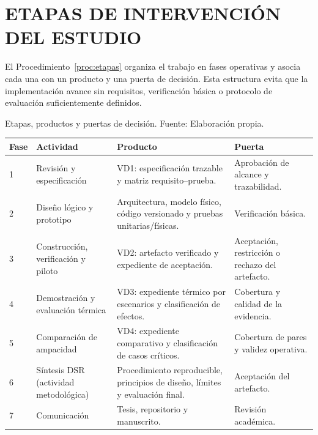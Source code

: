 \section{ETAPAS DE INTERVENCIÓN DEL ESTUDIO}

El Procedimiento~\ref{proc:etapas} organiza el trabajo en fases operativas y asocia cada una con un producto y una puerta de decisión. Esta estructura evita que la implementación avance sin requisitos, verificación básica o protocolo de evaluación suficientemente definidos.

\begin{procedure}[htbp]
\caption{Etapas, productos y puertas de decisión. Fuente: Elaboración propia.}
\label{proc:etapas}
\begin{tabularx}{\textwidth}{C{1.0cm}L{3.4cm}Y L{3.2cm}}
\toprule
\textbf{Fase} & \textbf{Actividad} & \textbf{Producto} & \textbf{Puerta} \\
 & Revisión y especificación & VD1: especificación trazable y matriz requisito--prueba. & Aprobación de alcance y trazabilidad. \\
  2 & Diseño lógico y prototipo & Arquitectura, modelo físico, código versionado y pruebas unitarias/físicas. & Verificación básica. \\
  3 & Construcción, verificación y piloto & VD2: artefacto verificado y expediente de aceptación. & Aceptación, restricción o rechazo del artefacto. \\
  4 & Demostración y evaluación térmica & VD3: expediente térmico por escenarios y clasificación de efectos. & Cobertura y calidad de la evidencia. \\
  5 & Comparación de ampacidad & VD4: expediente comparativo y clasificación de casos críticos. & Cobertura de pares y validez operativa. \\
6 & Síntesis DSR (actividad metodológica) & Procedimiento reproducible, principios de diseño, límites y evaluación final. & Aceptación del artefacto. \\
7 & Comunicación & Tesis, repositorio y manuscrito. & Revisión académica. \\
\bottomrule
\end{tabularx}
\end{procedure}

